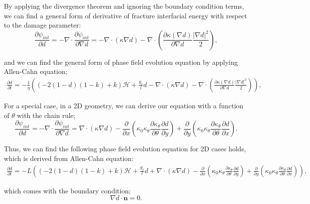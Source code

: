 \documentclass[3p,10pt,sort&compress]{elsarticle}
\begin{document}
By applying the divergence theorem and ignoring the boundary condition terms, we can find a general form of derivative of fracture interfacial energy with respect to the damage parameter:
\begin{equation}
  \frac{\partial \psi_{int}}{\partial d} = -\nabla \cdot \frac{\partial \psi_{int}}{\partial \nabla d} = -\nabla \cdot (\kappa \nabla d) - \nabla \cdot \left(\frac{\partial \kappa(\nabla d)}{\partial \nabla d} \frac{|\nabla d|^2}{2} \right),
\end{equation}


and we can find the general form of phase field evolution equation by applying Allen-Cahn equation;
\begin{eqnarray}
	\frac{\partial d}{\partial t} = -\frac{1}{\eta} \left( (-2(1-d)(1-k) + k) \mathcal{H} + \frac{g_c}{l}d - \nabla \cdot (\kappa \nabla d) - \nabla \cdot \left(\frac{\partial \kappa(\nabla d)}{\partial \nabla d} \frac{|\nabla d|^2}{2} \right) \right),
\end{eqnarray}


For a special case, in a 2D geometry, we can derive our equation with a function of $\theta$ with the chain rule;
\begin{equation}
  \frac{\partial \psi_{int}}{\partial d} = -\nabla \cdot \frac{\partial \psi_{int}}{\partial \nabla d} = \nabla \cdot (\kappa \nabla d) -\frac{\partial}{\partial x} \left( \kappa_0 \kappa_{\theta} \frac{\partial \kappa_{\theta}}{\partial \theta} \frac{\partial d}{\partial y}  \right) + \frac{\partial}{\partial y} \left( \kappa_0 \kappa_{\theta} \frac{\partial \kappa_{\theta}}{\partial \theta} \frac{\partial d}{\partial x}  \right).
\end{equation}


Thus, we can find the following phase field evolution equation for 2D cases holds, which is derived from Allen-Cahn equation:
\begin{eqnarray}
	\frac{\partial d}{\partial t} = -L \left( (-2(1-d)(1-k) + k) \mathcal{H} + \frac{g_c}{l}d + \nabla \cdot (\kappa \nabla d) -\frac{\partial}{\partial x} \left( \kappa_0 \kappa_{\theta} \frac{\partial \kappa_{\theta}}{\partial \theta} \frac{\partial d}{\partial y}  \right) + \frac{\partial}{\partial y} \left( \kappa_0 \kappa_{\theta} \frac{\partial \kappa_{\theta}}{\partial \theta} \frac{\partial d}{\partial x}  \right) \right),
\end{eqnarray}

which comes with the boundary condition;
\begin{equation}
  \nabla d \cdot \boldsymbol{n} = 0.
\end{equation}
\end{document}
